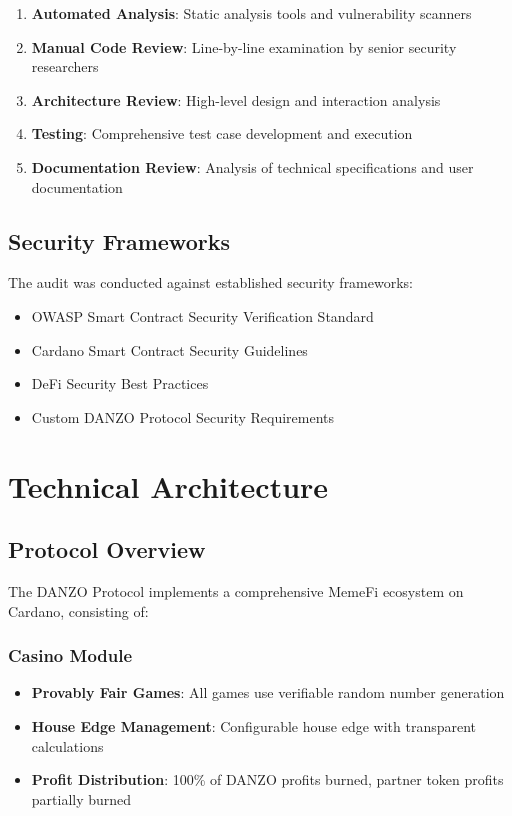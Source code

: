 \documentclass[11pt,a4paper]{article}
\begin{document}
\begin{enumerate}
    \item \textbf{Automated Analysis}: Static analysis tools and vulnerability scanners
    \item \textbf{Manual Code Review}: Line-by-line examination by senior security researchers
    \item \textbf{Architecture Review}: High-level design and interaction analysis
    \item \textbf{Testing}: Comprehensive test case development and execution
    \item \textbf{Documentation Review}: Analysis of technical specifications and user documentation
\end{enumerate}

\subsection{Security Frameworks}
The audit was conducted against established security frameworks:
\begin{itemize}
    \item OWASP Smart Contract Security Verification Standard
    \item Cardano Smart Contract Security Guidelines
    \item DeFi Security Best Practices
    \item Custom DANZO Protocol Security Requirements
\end{itemize}

\section{Technical Architecture}

\subsection{Protocol Overview}
The DANZO Protocol implements a comprehensive MemeFi ecosystem on Cardano, consisting of:

\subsubsection{Casino Module}
\begin{itemize}
    \item \textbf{Provably Fair Games}: All games use verifiable random number generation
    \item \textbf{House Edge Management}: Configurable house edge with transparent calculations
    \item \textbf{Profit Distribution}: 100\% of DANZO profits burned, partner token profits partially burned
\end{itemize}
\end{document}

